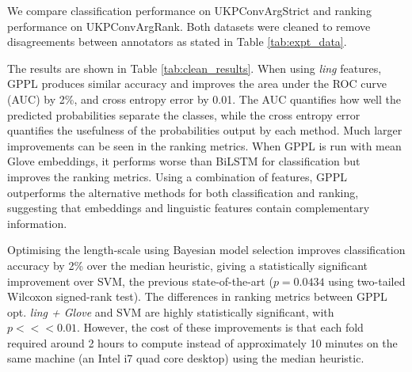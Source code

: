 % 
% 
We compare classification performance on UKPConvArgStrict  
and ranking performance on UKPConvArgRank. 
Both datasets were cleaned to remove disagreements between annotators as stated in Table \ref{tab:expt_data}.

The results are shown in Table \ref{tab:clean_results}. When using \emph{ling} features,
GPPL produces similar accuracy and improves the area under the ROC curve (AUC) by 2\%,
and cross entropy error by 0.01.
The AUC quantifies how well the predicted probabilities separate the classes,
while the cross entropy error quantifies the usefulness of the probabilities output by each method.
Much larger improvements can be seen in the ranking metrics. 
When GPPL is run with mean Glove embeddings, it performs worse than
BiLSTM for classification but improves the ranking metrics. Using a combination of features,
GPPL outperforms the alternative methods for both classification and ranking, 
suggesting that embeddings and linguistic features contain complementary information.

Optimising the length-scale using Bayesian model selection improves classification accuracy by 2\% over the median heuristic,
giving a statistically significant improvement over SVM, the previous state-of-the-art ($p=0.0434$ using
two-tailed Wilcoxon signed-rank test).
The differences in ranking metrics between GPPL opt. \emph{ling + Glove}
and SVM are highly statistically significant, with $p <<<0.01$.
However, the cost of these improvements is that each fold required around 2 hours to compute instead of approximately 10 minutes on the same machine (an Intel i7 quad core desktop) using the median heuristic. 

